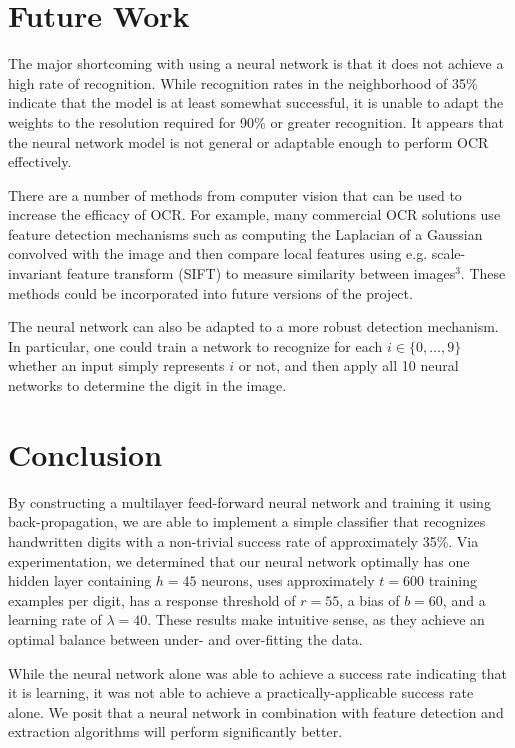 \documentclass[11pt]{article}
\begin{document}
\section{Future Work}

The major shortcoming with using a neural network is that it does not achieve a high rate of recognition. While recognition rates in the neighborhood of 35\% indicate that the model is at least somewhat successful, it is unable to adapt the weights to the resolution required for 90\% or greater recognition. It appears that the neural network model is not general or adaptable enough to perform OCR effectively.

There are a number of methods from computer vision that can be used to increase the efficacy of OCR. For example, many commercial OCR solutions use feature detection mechanisms such as computing the Laplacian of a Gaussian convolved with the image and then compare local features using e.g. scale-invariant feature transform (SIFT) to measure similarity between images$^3$. These methods could be incorporated into future versions of the project.

The neural network can also be adapted to a more robust detection mechanism. In particular, one could train a network to recognize for each $i\in \{0,\dots,9\}$ whether an input simply represents $i$ or not, and then apply all 10 neural networks to determine the digit in the image.

\section{Conclusion}

By constructing a multilayer feed-forward neural network and training it using back-propagation, we are able to implement a simple classifier that recognizes handwritten digits with a non-trivial success rate of approximately 35\%. Via experimentation, we determined that our neural network optimally has one hidden layer containing $h=45$ neurons, uses approximately $t=600$ training examples per digit, has a response threshold of $r=55$, a bias of $b=60$, and a learning rate of $\lambda=40$. These results make intuitive sense, as they achieve an optimal balance between under- and over-fitting the data.

While the neural network alone was able to achieve a success rate indicating that it is learning, it was not able to achieve a practically-applicable success rate alone. We posit that a neural network in combination with feature detection and extraction algorithms will perform significantly better.
\end{document}
